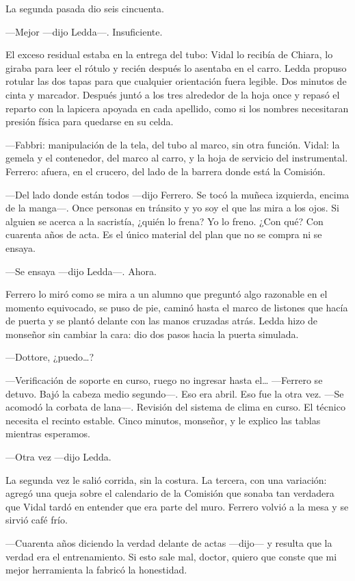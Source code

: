 La segunda pasada dio seis cincuenta.

---Mejor ---dijo Ledda---. Insuficiente.

El exceso residual estaba en la entrega del tubo: Vidal lo recibía de Chiara, lo giraba para leer el rótulo y recién después lo asentaba en el carro. Ledda propuso rotular las dos tapas para que cualquier orientación fuera legible. Dos minutos de cinta y marcador. Después juntó a los tres alrededor de la hoja once y repasó el reparto con la lapicera apoyada en cada apellido, como si los nombres necesitaran presión física para quedarse en su celda.

---Fabbri: manipulación de la tela, del tubo al marco, sin otra función. Vidal: la gemela y el contenedor, del marco al carro, y la hoja de servicio del instrumental. Ferrero: afuera, en el crucero, del lado de la barrera donde está la Comisión.

---Del lado donde están todos ---dijo Ferrero. Se tocó la muñeca izquierda, encima de la manga---. Once personas en tránsito y yo soy el que las mira a los ojos. Si alguien se acerca a la sacristía, ¿quién lo frena? Yo lo freno. ¿Con qué? Con cuarenta años de acta. Es el único material del plan que no se compra ni se ensaya.

---Se ensaya ---dijo Ledda---. Ahora.

Ferrero lo miró como se mira a un alumno que preguntó algo razonable en el momento equivocado, se puso de pie, caminó hasta el marco de listones que hacía de puerta y se plantó delante con las manos cruzadas atrás. Ledda hizo de monseñor sin cambiar la cara: dio dos pasos hacia la puerta simulada.

---Dottore, ¿puedo\ldots{}?

---Verificación de soporte en curso, ruego no ingresar hasta el\ldots{} ---Ferrero se detuvo. Bajó la cabeza medio segundo---. Eso era abril. Eso fue la otra vez. ---Se acomodó la corbata de lana---. Revisión del sistema de clima en curso. El técnico necesita el recinto estable. Cinco minutos, monseñor, y le explico las tablas mientras esperamos.

---Otra vez ---dijo Ledda.

La segunda vez le salió corrida, sin la costura. La tercera, con una variación: agregó una queja sobre el calendario de la Comisión que sonaba tan verdadera que Vidal tardó en entender que era parte del muro. Ferrero volvió a la mesa y se sirvió café frío.

---Cuarenta años diciendo la verdad delante de actas ---dijo--- y resulta que la verdad era el entrenamiento. Si esto sale mal, doctor, quiero que conste que mi mejor herramienta la fabricó la honestidad.

